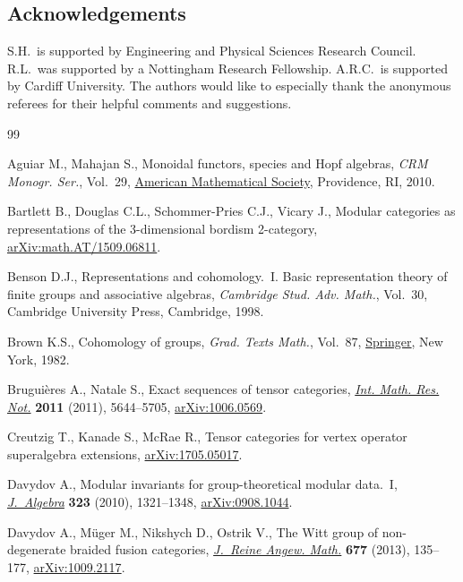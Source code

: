 \documentclass[pdftex]{sigma}
\numberwithin{equation}{section}
\begin{document}
\subsection*{Acknowledgements}

S.H.\ is supported by Engineering and Physical Sciences Research Council.
R.L.\ was supported by a Nottingham Research Fellowship.
 A.R.C.\ is supported by Cardiff University. The authors would like to especially thank the anonymous referees for their helpful comments and suggestions.

\begin{thebibliography}{99}
\footnotesize\itemsep=0pt

Aguiar M., Mahajan S., Monoidal functors, species and {H}opf algebras,
 \textit{CRM Monogr. Ser.}, Vol.~29, \href{https://doi.org/10.1090/crmm/029}{American Mathematical Society},
 Providence, RI, 2010.

Bartlett B., Douglas C.L., Schommer-Pries C.J., Vicary J., Modular categories
 as representations of the 3-dimensional bordism 2-category,
 \href{https://arxiv.org/abs/math.AT/1509.06811}{arXiv:math.AT/1509.06811}.

Benson D.J., Representations and cohomology.~{I}. {B}asic representation theory
 of finite groups and associative algebras, \textit{Cambridge Stud. Adv.
 Math.}, Vol.~30, Cambridge University Press, Cambridge, 1998.

Brown K.S., Cohomology of groups, \textit{Grad. Texts Math.}, Vol.~87,
 \href{https://doi.org/10.1007/978-1-4684-9327-6}{Springer}, New York, 1982.

Brugui\`eres A., Natale S., Exact sequences of tensor categories, \href{https://doi.org/10.1093/imrn/rnq294}{\textit{Int.
 Math. Res. Not.}} \textbf{2011} (2011), 5644--5705, \href{https://arxiv.org/abs/1006.0569}{arXiv:1006.0569}.

Creutzig T., Kanade S., McRae R., Tensor categories for vertex operator
 superalgebra extensions, \href{https://arxiv.org/abs/1705.05017}{arXiv:1705.05017}.

Davydov A., Modular invariants for group-theoretical modular data.~{I},
 \href{https://doi.org/10.1016/j.jalgebra.2009.11.041}{\textit{J.~Algebra}} \textbf{323} (2010), 1321--1348, \href{https://arxiv.org/abs/0908.1044}{arXiv:0908.1044}.

Davydov A., M\"uger M., Nikshych D., Ostrik V., The {W}itt group of
 non-degenerate braided fusion categories, \href{https://doi.org/10.1515/crelle.2012.014}{\textit{J.~Reine Angew. Math.}}
 \textbf{677} (2013), 135--177, \href{https://arxiv.org/abs/1009.2117}{arXiv:1009.2117}.


\end{thebibliography}
\end{document}
